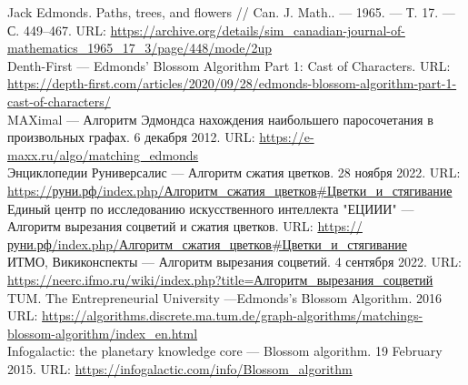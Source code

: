 \documentclass[14pt, a4paper]{extarticle}
\begin{document}
    \begin{thebibliography}{}

    Jack Edmonds. Paths, trees, and flowers // Can. J. Math.. — 1965. — Т. 17. — С. 449–467.
    URL: \href{https://archive.org/details/sim_canadian-journal-of-mathematics_1965_17_3/page/448/mode/2up}{https://archive.org/details/sim\_canadian-journal-of-mathematics\_1965\_17\_3/page/448/mode/2up}\\
    
    Denth-First --- Edmonds' Blossom Algorithm Part 1: Cast of Characters. URL: \href{https://depth-first.com/articles/2020/09/28/edmonds-blossom-algorithm-part-1-cast-of-characters/}
    {https://depth-first.com/articles/2020/09/28/edmonds-blossom-algorithm-part-1-cast-of-characters/}\\

    MAXimal --- Алгоритм Эдмондса нахождения наибольшего паросочетания в произвольных графах. 6 декабря 2012. 
    URL: \href{https://e-maxx.ru/algo/matching_edmonds}
    {https://e-maxx.ru/algo/matching\_edmonds}\\
    
    Энциклопедии Руниверсалис --- Алгоритм сжатия цветков.  28 ноября 2022. URL: \href{https://руни.рф/index.php/Алгоритм_сжатия_цветков#Цветки_и_стягивание}
    {https://руни.рф/index.php/Алгоритм\_сжатия\_цветков\#Цветки\_и\_стягивание}\\
    
    Единый центр по исследованию искусственного интеллекта "ЕЦИИИ" --- Алгоритм вырезания соцветий и сжатия цветков. URL: \href{https://intellect.icu/algoritm-vyrezaniya-sotsvetij-i-szhatiya-tsvetkov-8626}
    {https://руни.рф/index.php/Алгоритм\_сжатия\_цветков\#Цветки\_и\_стягивание}\\

    ИТМО, Викиконспекты --- Алгоритм вырезания соцветий.  4 сентября 2022. 
    URL: \href{https://neerc.ifmo.ru/wiki/index.php?title=Алгоритм_вырезания_соцветий}{https://neerc.ifmo.ru/wiki/index.php?title=Алгоритм\_вырезания\_соцветий}\\

    TUM. The Entrepreneurial University ---Edmonds's Blossom Algorithm. 2016 URL: \href{https://algorithms.discrete.ma.tum.de/graph-algorithms/matchings-blossom-algorithm/index_en.html}
    {https://algorithms.discrete.ma.tum.de/graph-algorithms/matchings-blossom-algorithm/index_en.html}\\

    Infogalactic: the planetary knowledge core --- Blossom algorithm. 19 February 2015. URL: \href{https://infogalactic.com/info/Blossom_algorithm}
    {https://infogalactic.com/info/Blossom_algorithm}\\

    \end{thebibliography}    
    
    \printbibliography
    
\end{document}

